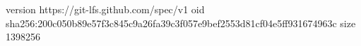 version https://git-lfs.github.com/spec/v1
oid sha256:200c050b89e57f3c845c9a26fa39c3f057e9bef2553d81cf04e5ff931674963c
size 1398256

